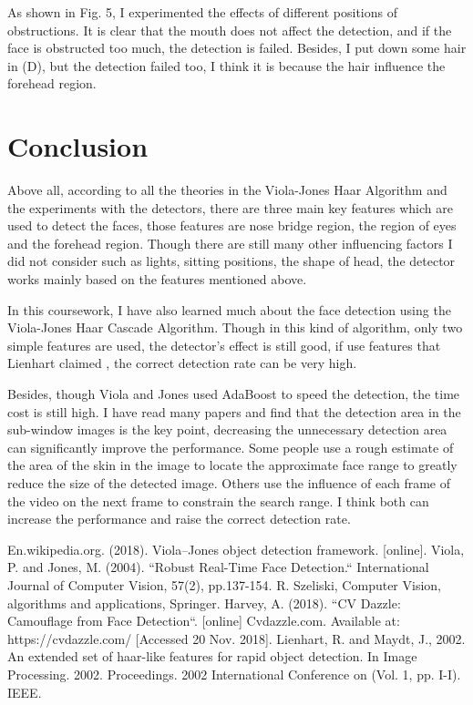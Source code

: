 \documentclass[conference]{IEEEtran}
\begin{document}
As shown in Fig. 5, I experimented the effects of different positions of obstructions. It is clear that the mouth does not affect the detection, and if the face is obstructed too much, the detection is failed. Besides, I put down some hair in (D), but the detection failed too, I think it is because the hair influence the forehead region.

\section{Conclusion}
Above all, according to all the theories in the Viola-Jones Haar Algorithm and the experiments with the detectors, there are three main key features which are used to detect the faces, those features are nose bridge region, the region of eyes and the forehead region. Though there are still many other influencing factors I did not consider such as lights, sitting positions, the shape of head, the detector works mainly based on the features mentioned above.

In this coursework, I have also learned much about the face detection using the Viola-Jones Haar Cascade Algorithm. Though in this kind of algorithm, only two simple features are used, the detector's effect is still good, if use features that Lienhart claimed \cite{b5}, the correct detection rate can be very high.

Besides, though Viola and Jones used AdaBoost to speed the detection, the time cost is still high. I have read many papers and find that the detection area in the sub-window images is the key point, decreasing the unnecessary detection area can significantly improve the performance. Some people use a rough estimate of the area of the skin in the image to locate the approximate face range to greatly reduce the size of the detected image. Others use the influence of each frame of the video on the next frame to constrain the search range. I think both can increase the performance and raise the correct detection rate.

\begin{thebibliography}{00}
 En.wikipedia.org. (2018). Viola–Jones object detection framework. [online].
 Viola, P. and Jones, M. (2004). ``Robust Real-Time Face Detection.`` International Journal of Computer Vision, 57(2), pp.137-154.
 R. Szeliski, Computer Vision, algorithms and applications, Springer.
 Harvey, A. (2018). ``CV Dazzle: Camouflage from Face Detection``. [online] Cvdazzle.com. Available at: https://cvdazzle.com/ [Accessed 20 Nov. 2018].
 Lienhart, R. and Maydt, J., 2002. An extended set of haar-like features for rapid object detection. In Image Processing. 2002. Proceedings. 2002 International Conference on (Vol. 1, pp. I-I). IEEE.
\end{thebibliography}
\end{document}
